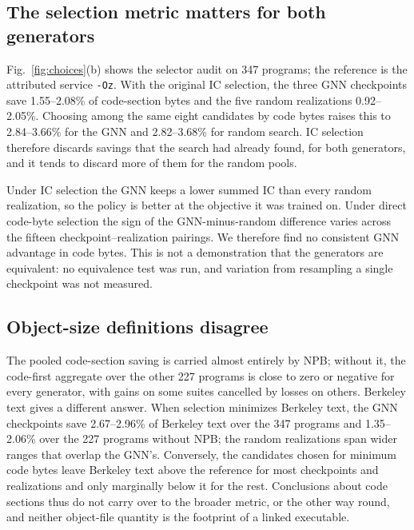 \documentclass[conference,a4paper]{IEEEtran}
\begin{document}
\subsection{The selection metric matters for both generators}
Fig.~\ref{fig:choices}(b) shows the selector audit on 347 programs; the
reference is the attributed service \texttt{-Oz}. With the original IC
selection, the three GNN checkpoints save 1.55--2.08\% of code-section
bytes and the five random realizations 0.92--2.05\%. Choosing among the
same eight candidates by code bytes raises this to 2.84--3.66\% for the
GNN and 2.82--3.68\% for random search. IC selection therefore discards
savings that the search had already found, for both generators, and it
tends to discard more of them for the random pools.

Under IC selection the GNN keeps a lower summed IC than every random
realization, so the policy is better at the objective it was trained
on. Under direct code-byte selection the sign of the GNN-minus-random
difference varies across the fifteen checkpoint--realization pairings.
We therefore find no consistent GNN advantage in code bytes. This is
not a demonstration that the generators are equivalent: no equivalence
test was run, and variation from resampling a single checkpoint was not
measured.

\subsection{Object-size definitions disagree}
The pooled code-section saving is carried almost entirely by NPB;
without it, the code-first aggregate over the other 227 programs is
close to zero or negative for every generator, with gains on some
suites cancelled by losses on others. Berkeley text gives a different
answer. When selection minimizes Berkeley text, the GNN checkpoints
save 2.67--2.96\% of Berkeley text over the 347 programs and
1.35--2.06\% over the 227 programs without NPB; the random realizations
span wider ranges that overlap the GNN's. Conversely, the candidates
chosen for minimum code bytes leave Berkeley text above the reference
for most checkpoints and realizations and only marginally below it for
the rest. Conclusions about code sections thus do
not carry over to the broader metric, or the other way round, and
neither object-file quantity is the footprint of a linked executable.
\end{document}
